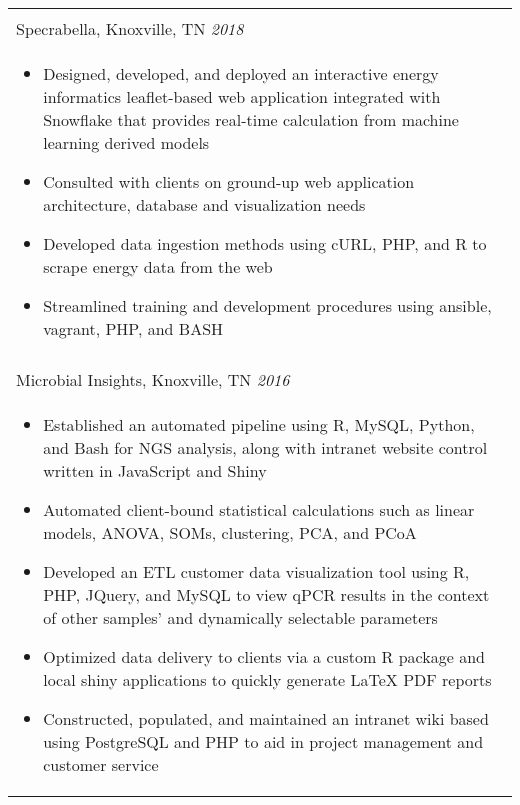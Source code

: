 \documentclass[10pt]{article}%
\begin{document}
   \begin{tabularx}{\linewidth}{M}%
          \\
         Specrabella, Knoxville, TN \textit{2018  } \\
      \begin{itemize}[topsep=-12pt,parsep=0em]
         \setlength\itemsep{0em}
         \item Designed, developed, and deployed an interactive energy informatics leaflet-based web application integrated with Snowflake that provides real-time calculation from machine learning derived models %
         \item Consulted with clients on ground-up web application architecture, database and visualization needs%
          \item Developed data ingestion methods using cURL, PHP, and R to scrape energy data from the web %
          \item Streamlined training and development procedures using ansible, vagrant, PHP, and BASH %
      \end{itemize} \\
       \\
      Microbial Insights, Knoxville, TN \textit{2016 } \\
      \begin{itemize}[topsep=-12pt,parsep=0em]
         \setlength\itemsep{0em}
         \item Established an automated pipeline using R, MySQL, Python, and Bash for NGS analysis, along with intranet website control written in JavaScript and Shiny  %
         \item Automated client-bound statistical calculations such as linear models, ANOVA, SOMs, clustering, PCA, and PCoA %
         \item Developed an ETL customer data visualization tool using R, PHP, JQuery, and MySQL to view qPCR results in the context of other samples' and dynamically selectable parameters %
         \item Optimized data delivery to clients via a custom R package and local shiny applications to quickly generate \LaTeX{} PDF reports  %
         \item Constructed, populated, and maintained an intranet wiki based using PostgreSQL and PHP to aid in project management and customer service
        \end{itemize} \\

\end{tabularx}
\end{document}
